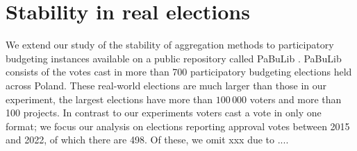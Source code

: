 \documentclass[twoside,11pt]{article}
\newcommand{\kibitz}[2]{\ifnum\Comments=1{\color{#1}{#2}}\fi}
\newcommand{\gb}[1]{\kibitz{red}{[GB:#1]}}
\newcommand{\points}{\textsc{Points}}
\newcommand{\knap}{\textsc{Knap}}
\newcommand{\mes}{ES}
\newcommand{\pabu}{PaBuLib}
\begin{document}



\gb{responsiveness  message not entirely clear. perhaps in discussion  + point to appendix}

\section{Stability in real elections}\label{sec:stability}

We extend our study of the stability of aggregation methods to participatory budgeting instances available on a public repository called \pabu{} . \pabu{} consists of the votes cast in more than 700 participatory budgeting elections held across Poland. 
These real-world elections are much larger than those in our experiment, the largest elections have more than $100\,000$ voters and more than 100 projects.
In contrast to our experiments voters cast a vote in only one format; we focus our analysis on elections reporting approval votes between 2015 and 2022, of which there are   498. Of these, we omit xxx due to ....\gb{Roy   please check all these numbers to make sure we report what we actually did. }
\end{document}
